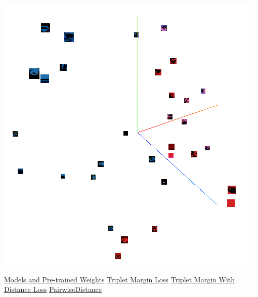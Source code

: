 \documentclass[11pt]{article}
\begin{document}
\begin{center}
    \begin{minipage}{0.48\linewidth}
    \includegraphics[width=\linewidth]{tensorboard_2.png}
    \end{minipage}
\end{center}




\pagebreak

\begin{thebibliography}{4}

 \href{https://pytorch.org/vision/stable/models.html}{Models and Pre-trained Weights}
 \href{
    https://pytorch.org/docs/stable/generated/torch.nn.TripletMarginLoss.html
}{Triplet Margin Loss}
 \href{
    https://pytorch.org/docs/stable/generated/torch.nn.TripletMarginWithDistanceLoss.html#torch.nn.TripletMarginWithDistanceLoss
}{Triplet Margin With Distance Loss}
 \href{
    https://pytorch.org/docs/stable/generated/torch.nn.PairwiseDistance.html
}{PairwiseDistance}



\end{thebibliography}


\pagebreak
\end{document}
